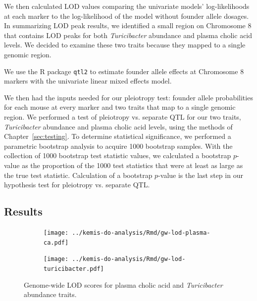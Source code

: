 \documentclass[oneside]{book}\usepackage[]{graphicx}\usepackage[]{color}
\begin{document}
We then calculated LOD values comparing the univariate models' 
log-likelihoods at each marker to the log-likelihood of 
the model without founder allele dosages. 
In summarizing LOD peak results, we identified a 
small region on Chromosome 8 that contains LOD peaks for both 
\emph{Turicibacter} abundance and plasma cholic acid levels. We decided to examine these two traits because they mapped to a single genomic region.



We use the R package \texttt{qtl2} to estimate founder allele effects 
at Chromosome 8 markers with
the univariate linear mixed effects model. 



We then had the inputs needed for our pleiotropy test: 
founder allele probabilities for each mouse at every 
marker and two traits that map to a single genomic region. 
We performed a test of pleiotropy vs. separate QTL for our two traits, 
\emph{Turicibacter} abundance and plasma cholic acid levels, 
using the methods of Chapter~\ref{sec:testing}. 
To determine statistical significance, we performed a 
parametric bootstrap analysis to acquire 1000 bootstrap samples. 
With the collection of 1000 bootstrap test statistic values, we calculated a 
bootstrap $p$-value as the proportion of the 1000 test statistics
that were at least as large as the true test statistic. 
Calculation of a bootstrap $p$-value is the last step in our hypothesis test for pleiotropy vs. separate QTL.



\subsection{Results}

\begin{figure}
\begin{subfigure}[t]{\textwidth}
\centering
\texttt{[image: ../kemis-do-analysis/Rmd/gw-lod-plasma-ca.pdf]}
\end{subfigure}
\begin{subfigure}[t]{\textwidth}
\centering
\texttt{[image: ../kemis-do-analysis/Rmd/gw-lod-turicibacter.pdf]}
\end{subfigure}

\caption{Genome-wide LOD scores for plasma cholic acid and \emph{Turicibacter} abundance traits.}\label{fig:gw-lod-microbiome}
\end{figure}
\end{document}
